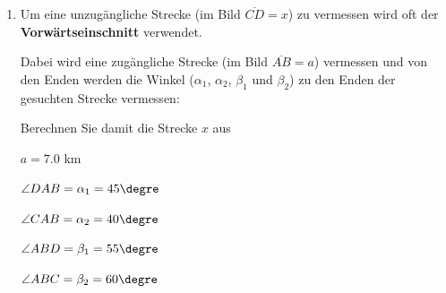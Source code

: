 \begin{enumerate}[resume=aufgaben]
    \item Um eine unzugängliche Strecke (im Bild $\overline{CD}=x$) zu vermessen wird oft der
    \textbf{Vorwärtseinschnitt} verwendet.

    Dabei wird eine zugängliche Strecke (im Bild $\overline{AB}=a$) vermessen und
    von den Enden werden die Winkel ($\alpha_1$, $\alpha_2$, $\beta_1$
    und $\beta_2$) zu den Enden der gesuchten Strecke vermessen:


Berechnen Sie damit die Strecke $x$ aus

$a=7.0$ km

$\angle DAB= \alpha_1 = 45\degre$

$\angle CAB= \alpha_2 = 40\degre$

$\angle ABD= \beta_1 = 55\degre$

$\angle ABC= \beta_2 = 60\degre$

\end{enumerate}
\TNTeop{}


